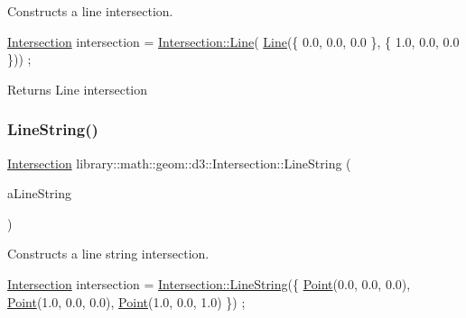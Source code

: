 Constructs a line intersection. 


\begin{DoxyCode}
\hyperlink{classlibrary_1_1math_1_1geom_1_1d3_1_1_intersection_afbaef540a058ccc7e58f1be2585304a9}{Intersection} intersection = \hyperlink{classlibrary_1_1math_1_1geom_1_1d3_1_1_intersection_a3f099c46287b3dfb2e51c26b73fe0f8e}{Intersection::Line}(
      \hyperlink{classlibrary_1_1math_1_1geom_1_1d3_1_1_intersection_a3f099c46287b3dfb2e51c26b73fe0f8e}{Line}(\{ 0.0, 0.0, 0.0 \}, \{ 1.0, 0.0, 0.0 \})) ;
\end{DoxyCode}


\begin{DoxyReturn}{Returns}
Line intersection 
\end{DoxyReturn}
\mbox{\label{classlibrary_1_1math_1_1geom_1_1d3_1_1_intersection_aa546d0185512a4c093a705a4c96f8960}} 
\subsubsection{\texorpdfstring{Line\+String()}{LineString()}}
{\footnotesize\ttfamily \hyperlink{classlibrary_1_1math_1_1geom_1_1d3_1_1_intersection}{Intersection} library\+::math\+::geom\+::d3\+::\+Intersection\+::\+Line\+String (\begin{DoxyParamCaption}\item[{const \hyperlink{classlibrary_1_1math_1_1geom_1_1d3_1_1objects_1_1_line_string}{objects\+::\+Line\+String} \&}]{a\+Line\+String }\end{DoxyParamCaption})\hspace{0.3cm}{\ttfamily [static]}}



Constructs a line string intersection. 


\begin{DoxyCode}
\hyperlink{classlibrary_1_1math_1_1geom_1_1d3_1_1_intersection_afbaef540a058ccc7e58f1be2585304a9}{Intersection} intersection = \hyperlink{classlibrary_1_1math_1_1geom_1_1d3_1_1_intersection_aa546d0185512a4c093a705a4c96f8960}{Intersection::LineString}(\{ 
      \hyperlink{classlibrary_1_1math_1_1geom_1_1d3_1_1_intersection_a5155cc245bd2bf96a4296b0a8319c709}{Point}(0.0, 0.0, 0.0), \hyperlink{classlibrary_1_1math_1_1geom_1_1d3_1_1_intersection_a5155cc245bd2bf96a4296b0a8319c709}{Point}(1.0, 0.0, 0.0), \hyperlink{classlibrary_1_1math_1_1geom_1_1d3_1_1_intersection_a5155cc245bd2bf96a4296b0a8319c709}{Point}(1.0, 0.0, 1.0) \}) ;
\end{DoxyCode}


